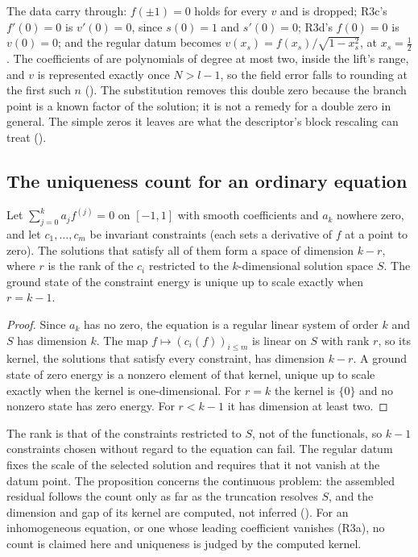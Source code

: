 The data carry through: $f(\pm1)=0$ holds for every $v$ and is dropped; R3c's $f'(0)=0$ is $v'(0)=0$, since $s(0)=1$ and $s'(0)=0$; R3d's $f(0)=0$ is $v(0)=0$; and the regular datum becomes $v(x_s)=f(x_s)/\sqrt{1-x_s^2}$, at $x_s=\tfrac12$. The coefficients of  are polynomials of degree at most two, inside the lift's range, and $v$ is represented exactly once $N>l-1$, so the field error falls to rounding at the first such $n$ (). The substitution removes this double zero because the branch point is a known factor of the solution; it is not a remedy for a double zero in general. The simple zeros it leaves are what the descriptor's block rescaling can treat ().

\subsection{The uniqueness count for an ordinary equation}
\label{app:uniqueness-count}
\begin{proposition}
    \label{prop:uniqueness-count}
    Let $\sum_{j=0}^{k}a_j f^{(j)}=0$ on $[-1,1]$ with smooth coefficients and $a_k$ nowhere zero, and let $c_1,\dots,c_m$ be invariant constraints (each sets a derivative of $f$ at a point to zero). The solutions that satisfy all of them form a space of dimension $k-r$, where $r$ is the rank of the $c_i$ restricted to the $k$-dimensional solution space $S$. The ground state of the constraint energy is unique up to scale exactly when $r=k-1$.
\end{proposition}
\begin{proof}
    Since $a_k$ has no zero, the equation is a regular linear system of order $k$ and $S$ has dimension $k$. The map $f\mapsto(c_i(f))_{i\le m}$ is linear on $S$ with rank $r$, so its kernel, the solutions that satisfy every constraint, has dimension $k-r$. A ground state of zero energy is a nonzero element of that kernel, unique up to scale exactly when the kernel is one-dimensional. For $r=k$ the kernel is $\{0\}$ and no nonzero state has zero energy. For $r<k-1$ it has dimension at least two.
\end{proof}
The rank is that of the constraints restricted to $S$, not of the functionals, so $k-1$ constraints chosen without regard to the equation can fail. The regular datum fixes the scale of the selected solution and requires that it not vanish at the datum point. The proposition concerns the continuous problem: the assembled residual follows the count only as far as the truncation resolves $S$, and the dimension and gap of its kernel are computed, not inferred (). For an inhomogeneous equation, or one whose leading coefficient vanishes (R3a), no count is claimed here and uniqueness is judged by the computed kernel.


